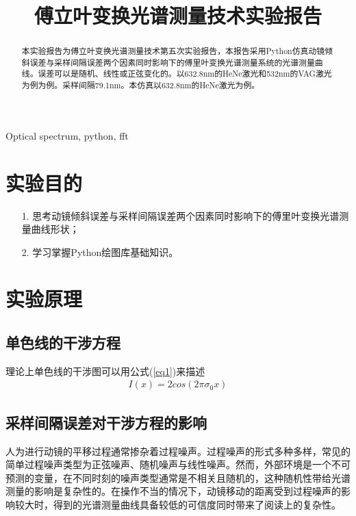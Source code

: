 \documentclass[conference]{IEEEtran}
\begin{document}
\title{傅立叶变换光谱测量技术实验报告}

\author{
}




\maketitle

\begin{abstract}
    本实验报告为傅立叶变换光谱测量技术第五次实验报告，本报告采用Python仿真动镜倾斜误差与采样间隔误差两个因素同时影响下的傅里叶变换光谱测量系统的光谱测量曲线。误差可以是随机、线性或正弦变化的。以632.8nm的HeNe激光和532nm的VAG激光为例为例。采样间隔79.1nm。本仿真以632.8nm的HeNe激光为例。
\end{abstract}

\begin{IEEEkeywords}
    Optical spectrum, python, fft
\end{IEEEkeywords}

\section{实验目的}
\begin{itemize}
    \item[1.] 思考动镜倾斜误差与采样间隔误差两个因素同时影响下的傅里叶变换光谱测量曲线形状；
    \item[2.] 学习掌握Python绘图库基础知识。 
\end{itemize} 

\section{实验原理}
\subsection{单色线的干涉方程}
理论上单色线的干涉图可以用公式(\ref{eq1})来描述
\begin{align}
    I(x) = 2cos(2\pi \sigma_0 x)    \label{eq1}
\end{align}

\subsection{采样间隔误差对干涉方程的影响}
人为进行动镜的平移过程通常掺杂着过程噪声。过程噪声的形式多种多样，常见的简单过程噪声类型为正弦噪声、随机噪声与线性噪声。然而，外部环境是一个不可预测的变量，在不同时刻的噪声类型通常是不相关且随机的，这种随机性带给光谱测量的影响是复杂性的。在操作不当的情况下，动镜移动的距离受到过程噪声的影响较大时，得到的光谱测量曲线具备较低的可信度同时带来了阅读上的复杂性。
\end{document}
